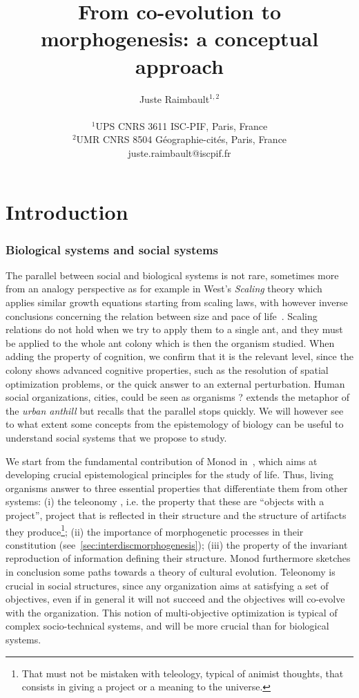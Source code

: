 \documentclass[letterpaper]{article}
\title{From co-evolution to morphogenesis: a conceptual approach}
\author{Juste Raimbault$^{1,2}$\\
\mbox{}\\
$^1$UPS CNRS 3611 ISC-PIF, Paris, France \\
$^2$UMR CNRS 8504 Géographie-cités, Paris, France \\
juste.raimbault@iscpif.fr} %
\begin{document}
\maketitle

\begin{abstract}
 
\end{abstract}

\section{Introduction}


\subsubsection{Biological systems and social systems}


The parallel between social and biological systems is not rare, sometimes more from an analogy perspective as for example in West's \emph{Scaling} theory which applies similar growth equations starting from scaling laws, with however inverse conclusions concerning the relation between size and pace of life~\cite{bettencourt2007growth}. Scaling relations do not hold when we try to apply them to a single ant, and they must be applied to the whole ant colony which is then the organism studied. When adding the property of cognition, we confirm that it is the relevant level, since the colony shows advanced cognitive properties, such as the resolution of spatial optimization problems, or the quick answer to an external perturbation. Human social organizations, cities, could be seen as organisms ? \cite{banos2013pour} extends the metaphor of the \emph{urban anthill} but recalls that the parallel stops quickly. We will however see to what extent some concepts from the epistemology of biology can be useful to understand social systems that we propose to study.

We start from the fundamental contribution of Monod in~\cite{monod1970hasard}, which aims at developing crucial epistemological principles for the study of life. Thus, living organisms answer to three essential properties that differentiate them from other systems: (i) the teleonomy , i.e. the property that these are ``objects with a project'', project that is reflected in their structure and the structure of artifacts they produce\footnote{That must not be mistaken with teleology, typical of animist thoughts, that consists in giving a project or a meaning to the universe.}; (ii) the importance of morphogenetic processes in their constitution (see~\ref{sec:interdiscmorphogenesis}); (iii) the property of the invariant reproduction of information defining their structure. Monod furthermore sketches in conclusion some paths towards a theory of cultural evolution. Teleonomy is crucial in social structures, since any organization aims at satisfying a set of objectives, even if in general it will not succeed and the objectives will co-evolve with the organization. This notion of multi-objective optimization is typical of complex socio-technical systems, and will be more crucial than for biological systems.
\end{document}
